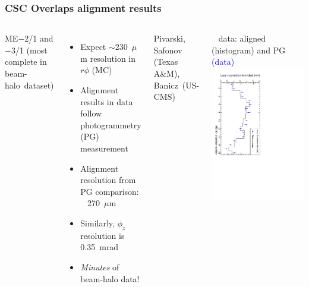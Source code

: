 \documentclass[compress]{beamer}
\begin{document}
\begin{frame}
\frametitle{CSC Overlaps alignment results}
\begin{columns}

ME$-$2/1 and $-$3/1 (most complete in \mbox{beam-halo dataset)\hspace{-1 cm}}

\begin{itemize}
\item Expect $\sim$230~$\mu$m resolution in $r\phi$ (MC)

\item Alignment results in data follow photogrammetry (PG) measurement

\item Alignment resolution from PG comparison: \\ \mbox{ } \hfill 270~$\mu$m \hfill \hfill \mbox{ }

\item Similarly, $\phi_z$ resolution is 0.35~mrad

\item {\it Minutes} of beam-halo \mbox{data!\hspace{-1 cm}}
\end{itemize}

\vspace{0.2 cm}
\tiny Pivarski, Safonov (Texas A\&M), \mbox{Banicz (US-CMS)\hspace{-1 cm}}


\vspace{0.2 cm}
\mbox{ } \hfill data: aligned (histogram) and PG \textcolor{blue}{(data)} \hfill \mbox{ }
\includegraphics[height=\linewidth, angle=90]{compare_m31_x.pdf}


\end{columns}
\end{frame}
\end{document}
